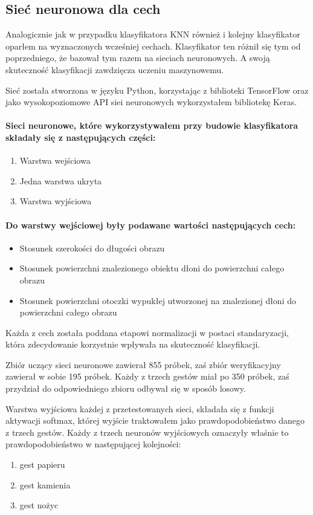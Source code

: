 \documentclass[a4paper,12pt,twoside,openany]{report}
\begin{document}
\subsection{Sieć neuronowa dla cech}
	Analogicznie jak w przypadku klasyfikatora KNN również i  kolejny klasyfikator oparłem na wyznaczonych wcześniej cechach. Klasyfikator ten różnił się tym od poprzedniego, że bazował tym razem na sieciach neuronowych. A swoją skuteczność klasyfikacji zawdzięcza uczeniu maszynowemu.
	
	Sieć została stworzona w języku Python, korzystając z biblioteki TensorFlow oraz jako wysokopoziomowe API siei neuronowych wykorzystałem bibliotekę Keras.
	
	\paragraph{Sieci neuronowe, które wykorzystywałem przy budowie klasyfikatora składały się z następujących części:}
	\begin{enumerate}
		\item Warstwa wejściowa
		\item Jedna warstwa ukryta
		\item Warstwa wyjściowa
	\end{enumerate}

	\paragraph{Do warstwy wejściowej były podawane wartości następujących cech:}
	\begin{itemize}
		\item Stosunek szerokości do długości obrazu
		\item Stosunek powierzchni znalezionego obiektu dłoni do powierzchni całego obrazu
		\item Stosunek powierzchni otoczki wypukłej utworzonej na znalezionej dłoni do powierzchni całego obrazu
	\end{itemize}
	\noindent
	Każda z cech została poddana etapowi normalizacji w postaci standaryzacji, która zdecydowanie korzystnie wpływała na skuteczność klasyfikacji.
	
	Zbiór uczący sieci neuronowe zawierał 855 próbek, zaś zbiór weryfikacyjny zawierał w sobie 195 próbek. Każdy z trzech gestów miał po 350 próbek, zaś przydział do odpowiedniego zbioru odbywał się w sposób losowy.
	
	Warstwa wyjściowa każdej z przetestowanych sieci, składała się z funkcji aktywacji softmax, której wyjście traktowałem jako prawdopodobieństwo danego z trzech gestów. Każdy z trzech neuronów wyjściowych oznaczyły właśnie to prawdopodobieństwo w następującej kolejności:
	\begin{enumerate}
		\item gest papieru
		\item gest kamienia
		\item gest nożyc
	\end{enumerate}
	
\end{document}
